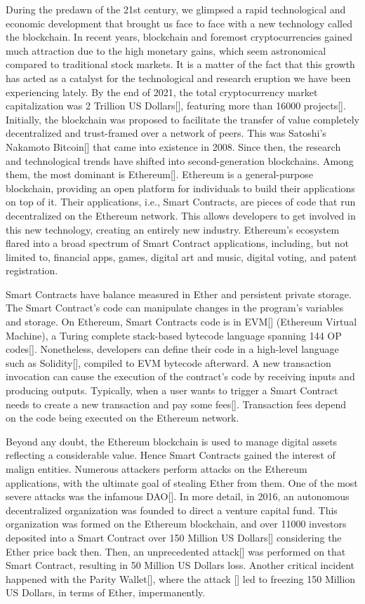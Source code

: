 \documentclass[a4paper,11pt]{article}
\begin{document}
During the predawn of the 21st century, we glimpsed a rapid technological and
economic development that brought us face to face with a new technology called
the blockchain. In recent years, blockchain and foremost cryptocurrencies gained
much attraction due to the high monetary gains, which seem astronomical compared
to traditional stock markets. It is a matter of the fact that this growth has
acted as a catalyst for the technological and research eruption we have been
experiencing lately. By the end of 2021, the total cryptocurrency market
capitalization was 2 Trillion US Dollars[], featuring more than 16000 projects[].
Initially, the blockchain was proposed to facilitate the transfer of value
completely decentralized and trust-framed over a network of peers. This was
Satoshi's Nakamoto Bitcoin[] that came into existence in 2008. Since then, the
research and technological trends have shifted into second-generation
blockchains. Among them, the most dominant is Ethereum[]. Ethereum is a
general-purpose blockchain, providing an open platform for individuals to build
their applications on top of it. Their applications, i.e., Smart Contracts, are
pieces of code that run decentralized on the Ethereum network. This allows
developers to get involved in this new technology, creating an entirely new
industry. Ethereum's ecosystem flared into a broad spectrum of Smart Contract
applications, including, but not limited to, financial apps, games, digital art
and music, digital voting, and patent registration. 

Smart Contracts have balance measured in Ether and persistent private storage.
The Smart Contract's code can manipulate changes in the program's variables and
storage. On Ethereum, Smart Contracts code is in EVM[] (Ethereum Virtual
Machine), a Turing complete stack-based bytecode language spanning 144 OP
codes[]. Nonetheless, developers can define their code in a high-level language
such as Solidity[], compiled to EVM bytecode afterward. A new transaction
invocation can cause the execution of the contract's code by receiving inputs
and producing outputs. Typically, when a user wants to trigger a Smart Contract
needs to create a new transaction and pay some fees[]. Transaction fees depend on
the code being executed on the Ethereum network.

Beyond any doubt, the Ethereum blockchain is used to manage digital assets
reflecting a considerable value. Hence Smart Contracts gained the interest of
malign entities. Numerous attackers perform attacks on the Ethereum
applications, with the ultimate goal of stealing Ether from them. One of the
most severe attacks was the infamous DAO[]. In more detail, in 2016, an
autonomous decentralized organization was founded to direct a venture capital
fund. This organization was formed on the Ethereum blockchain, and over 11000
investors deposited into a Smart Contract over 150 Million US Dollars[]
considering the Ether price back then. Then, an unprecedented attack[] was
performed on that Smart Contract, resulting in 50 Million US Dollars loss.
Another critical incident happened with the Parity Wallet[], where the attack []
led to freezing 150 Million US Dollars, in terms of Ether, impermanently.
\end{document}
